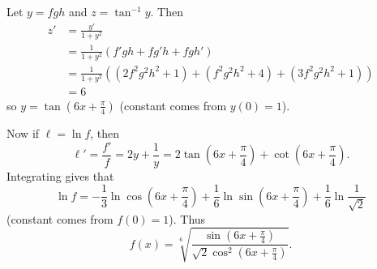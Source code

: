 Let $y=fgh$ and $z=\tan^{-1}y$. Then
\begin{align*}
	z'&=\frac{y'}{1+y^2}\\
	&=\frac{1}{1+y^2}(f'gh+fg'h+fgh')\\
	&=\frac{1}{1+y^2}\left((2f^2g^2h^2+1)+(f^2g^2h^2+4)+(3f^2g^2h^2+1)\right)\\
	&=6
\end{align*}
so $y=\tan\left(6x+\frac{\pi}{4}\right)$ (constant comes from $y(0)=1$).

Now if $\ell=\ln f$, then \[\ell'=\frac{f'}{f}=2y+\frac{1}{y}=2\tan\left(6x+\frac{\pi}{4}\right)+\cot\left(6x+\frac{\pi}{4}\right).\] Integrating gives that \[\ln f=-\frac{1}{3}\ln\cos\left(6x+\frac{\pi}{4}\right)+\frac{1}{6}\ln\sin\left(6x+\frac{\pi}{4}\right)+\frac{1}{6}\ln\frac{1}{\sqrt{2}}\] (constant comes from $f(0)=1$). Thus \[f(x)=\sqrt[6]{\frac{\sin\left(6x+\frac{\pi}{4}\right)}{\sqrt{2}\cos^2\left(6x+\frac{\pi}{4}\right)}}.\]